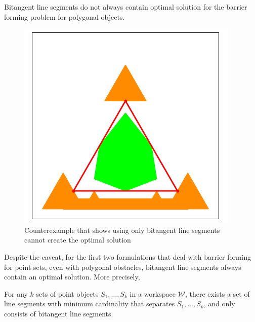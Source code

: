 \begin{proposition}
Bitangent line segments do not always contain optimal solution for the barrier forming problem for polygonal objects.
\end{proposition}

\begin{figure}[ht]
    \centering
    \vspace{-.2in}
    \includegraphics[width = .25\textwidth]{chapters/bf/fig/counter_example.png}
    \vspace{0.0in}
    \caption{Counterexample that shows using only bitangent line segments cannot create the optimal solution}
    \label{fig:bf-counter}
\end{figure}

Despite the caveat, for the first two formulations that deal with barrier forming for point sets, even with polygonal obstacles, bitangent line segments
always contain an optimal solution. More precisely, 
\begin{theorem}
For any $k$ sets of point objects $S_1, \dots, S_k$ in a workspace $\mathcal W$, there exists
a set of line segments with minimum cardinality that separates $S_1, \dots, S_k$, 
and only consists of bitangent line segments.
\end{theorem}

